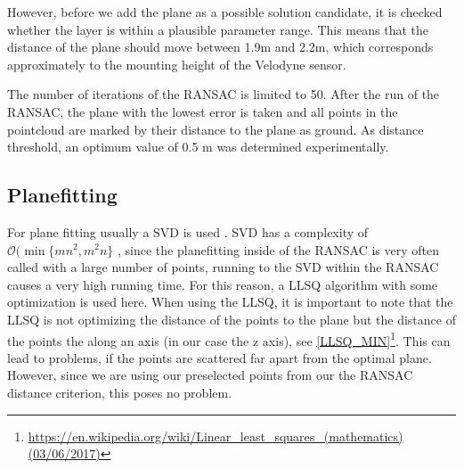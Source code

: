 \documentclass[11pt,oneside,openright]{mpreport}
\begin{document}
However, before we add the plane as a possible solution candidate, it is checked whether the layer is within a plausible parameter range.
This means that the distance of the plane should move between 1.9m and 2.2m, which corresponds approximately to the mounting height of the Velodyne sensor.

The number of iterations of the \ac{RANSAC} is limited to 50. After the run of the \ac{RANSAC}, the plane with the lowest error is taken and all points in the
pointcloud are marked by their distance to the plane as ground. As distance threshold, an optimum value of 0.5 m was determined experimentally.


\subsection{Planefitting}
\label{subssec:planefitting}



For plane fitting usually a \ac{SVD} is used \cite{Nurunnabi2012,Ram2007,Soderkvist2009}. SVD has a complexity of $\mathcal{O}(\min\{mn^2, m^2n\}$ \cite{Holmes2007}, since the planefitting inside
of the \ac{RANSAC} is very often called with a large number of points, running to the \ac{SVD} within the \ac{RANSAC} causes a very high running time.
For this reason, a \ac{LLSQ} algorithm with some optimization is used here.
When using the \ac{LLSQ}, it is important to note that the \ac{LLSQ} is not optimizing the distance of the points to the plane but the distance of the points the along an axis (in our case the z axis),
see \cref{LLSQ_MIN}\footnote{\url{https://en.wikipedia.org/wiki/Linear_least_squares_(mathematics) (03/06/2017)}}. This can lead to problems, if the points are scattered far apart from the optimal plane. However, since we are using our preselected points from our the \ac{RANSAC}
distance criterion, this poses no problem.
\end{document}
